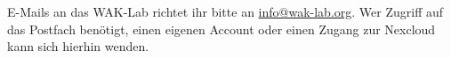 E-Mails an das WAK-Lab richtet ihr bitte an \url{info@wak-lab.org}. Wer Zugriff auf das Postfach benötigt, einen eigenen Account oder einen Zugang zur Nexcloud kann sich hierhin wenden.\\
